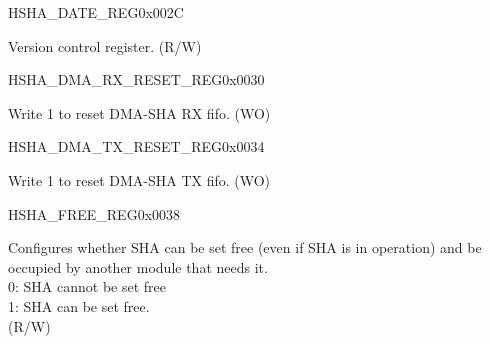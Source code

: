\begin{register}{H}{SHA\_DATE\_REG}{0x002C}\label{regdesc:SHADATEREG}
%
%
\regnewline%
\begin{regdesc}\begin{reglist}
\label{fielddesc:SHADATE}\item [SHA\_DATE] Version control register. (R/W)
\end{reglist}\end{regdesc}
\end{register}


\begin{register}{H}{SHA\_DMA\_RX\_RESET\_REG}{0x0030}\label{regdesc:SHADMARXRESETREG}
%
%
\regnewline%
\begin{regdesc}\begin{reglist}
\label{fielddesc:SHADMARXRESET}\item [SHA\_DMA\_RX\_RESET] Write 1 to reset DMA-SHA RX fifo. (WO)
\end{reglist}\end{regdesc}
\end{register}


\begin{register}{H}{SHA\_DMA\_TX\_RESET\_REG}{0x0034}\label{regdesc:SHADMATXRESETREG}
%
%
\regnewline%
\begin{regdesc}\begin{reglist}
\label{fielddesc:SHADMATXRESET}\item [SHA\_DMA\_TX\_RESET] Write 1 to reset DMA-SHA TX fifo. (WO)
\end{reglist}\end{regdesc}
\end{register}


\begin{register}{H}{SHA\_FREE\_REG}{0x0038}\label{regdesc:SHAFREEREG}
%
%
\regnewline%
\begin{regdesc}\begin{reglist}
\label{fielddesc:SHAFREE}\item [SHA\_FREE]Configures whether SHA can be set free (even if SHA is in operation) and be occupied by another module that needs it.\\
0: SHA cannot be set free\\
1: SHA can be set free. \\(R/W)
\end{reglist}\end{regdesc}
\end{register}


